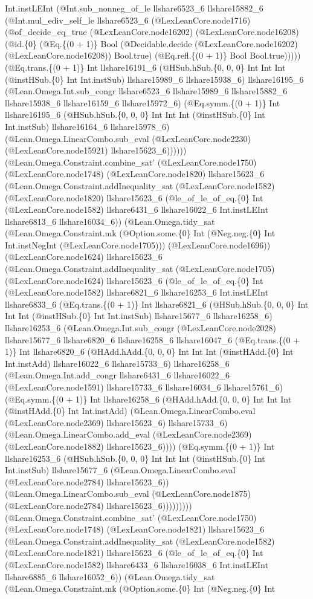 \documentclass[11pt]{article}
\begin{document}
Int.instLEInt (@Int.sub\_nonneg\_of\_le llshare6523\_6 llshare15882\_6 (@Int.mul\_ediv\_self\_le llshare6523\_6 (@LexLeanCore.node1716) (@of\_decide\_eq\_true (@LexLeanCore.node16202) (@LexLeanCore.node16208) (@id.\{0\} (@Eq.\{(0 + 1)\} Bool (@Decidable.decide (@LexLeanCore.node16202) (@LexLeanCore.node16208)) Bool.true) (@Eq.refl.\{(0 + 1)\} Bool Bool.true))))) (@Eq.trans.\{(0 + 1)\} Int llshare16191\_6 (@HSub.hSub.\{0, 0, 0\} Int Int Int (@instHSub.\{0\} Int Int.instSub) llshare15989\_6 llshare15938\_6) llshare16195\_6 (@Lean.Omega.Int.sub\_congr llshare6523\_6 llshare15989\_6 llshare15882\_6 llshare15938\_6 llshare16159\_6 llshare15972\_6) (@Eq.symm.\{(0 + 1)\} Int llshare16195\_6 (@HSub.hSub.\{0, 0, 0\} Int Int Int (@instHSub.\{0\} Int Int.instSub) llshare16164\_6 llshare15978\_6) (@Lean.Omega.LinearCombo.sub\_eval (@LexLeanCore.node2230) (@LexLeanCore.node15921) llshare15623\_6)))))) (@Lean.Omega.Constraint.combine\_sat' (@LexLeanCore.node1750) (@LexLeanCore.node1748) (@LexLeanCore.node1820) llshare15623\_6 (@Lean.Omega.Constraint.addInequality\_sat (@LexLeanCore.node1582) (@LexLeanCore.node1820) llshare15623\_6 (@le\_of\_le\_of\_eq.\{0\} Int (@LexLeanCore.node1582) llshare6431\_6 llshare16022\_6 Int.instLEInt llshare6813\_6 llshare16034\_6)) (@Lean.Omega.tidy\_sat (@Lean.Omega.Constraint.mk (@Option.some.\{0\} Int (@Neg.neg.\{0\} Int Int.instNegInt (@LexLeanCore.node1705))) (@LexLeanCore.node1696)) (@LexLeanCore.node1624) llshare15623\_6 (@Lean.Omega.Constraint.addInequality\_sat (@LexLeanCore.node1705) (@LexLeanCore.node1624) llshare15623\_6 (@le\_of\_le\_of\_eq.\{0\} Int (@LexLeanCore.node1582) llshare6821\_6 llshare16253\_6 Int.instLEInt llshare6833\_6 (@Eq.trans.\{(0 + 1)\} Int llshare6821\_6 (@HSub.hSub.\{0, 0, 0\} Int Int Int (@instHSub.\{0\} Int Int.instSub) llshare15677\_6 llshare16258\_6) llshare16253\_6 (@Lean.Omega.Int.sub\_congr (@LexLeanCore.node2028) llshare15677\_6 llshare6820\_6 llshare16258\_6 llshare16047\_6 (@Eq.trans.\{(0 + 1)\} Int llshare6820\_6 (@HAdd.hAdd.\{0, 0, 0\} Int Int Int (@instHAdd.\{0\} Int Int.instAdd) llshare16022\_6 llshare15733\_6) llshare16258\_6 (@Lean.Omega.Int.add\_congr llshare6431\_6 llshare16022\_6 (@LexLeanCore.node1591) llshare15733\_6 llshare16034\_6 llshare15761\_6) (@Eq.symm.\{(0 + 1)\} Int llshare16258\_6 (@HAdd.hAdd.\{0, 0, 0\} Int Int Int (@instHAdd.\{0\} Int Int.instAdd) (@Lean.Omega.LinearCombo.eval (@LexLeanCore.node2369) llshare15623\_6) llshare15733\_6) (@Lean.Omega.LinearCombo.add\_eval (@LexLeanCore.node2369) (@LexLeanCore.node1882) llshare15623\_6)))) (@Eq.symm.\{(0 + 1)\} Int llshare16253\_6 (@HSub.hSub.\{0, 0, 0\} Int Int Int (@instHSub.\{0\} Int Int.instSub) llshare15677\_6 (@Lean.Omega.LinearCombo.eval (@LexLeanCore.node2784) llshare15623\_6)) (@Lean.Omega.LinearCombo.sub\_eval (@LexLeanCore.node1875) (@LexLeanCore.node2784) llshare15623\_6))))))))) (@Lean.Omega.Constraint.combine\_sat' (@LexLeanCore.node1750) (@LexLeanCore.node1748) (@LexLeanCore.node1821) llshare15623\_6 (@Lean.Omega.Constraint.addInequality\_sat (@LexLeanCore.node1582) (@LexLeanCore.node1821) llshare15623\_6 (@le\_of\_le\_of\_eq.\{0\} Int (@LexLeanCore.node1582) llshare6433\_6 llshare16038\_6 Int.instLEInt llshare6885\_6 llshare16052\_6)) (@Lean.Omega.tidy\_sat (@Lean.Omega.Constraint.mk (@Option.some.\{0\} Int (@Neg.neg.\{0\} Int 
\end{document}
